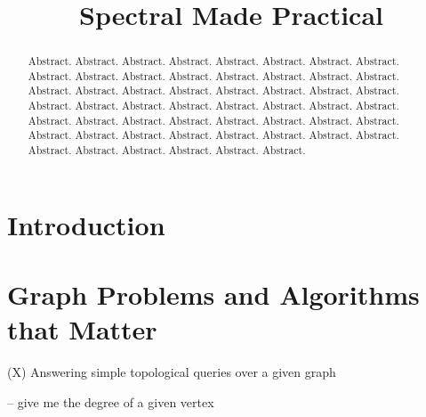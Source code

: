 \documentclass[preprint]{sig-alternate-05-2015}
\begin{document}
\title{Spectral Made Practical}

\maketitle

\begin{abstract}
%
Abstract. Abstract.  Abstract. Abstract.  Abstract. Abstract.  Abstract.
Abstract.  Abstract. Abstract.  Abstract. Abstract.  Abstract. Abstract.
Abstract. Abstract.  Abstract. Abstract.  Abstract. Abstract.  Abstract.
Abstract.  Abstract. Abstract.  Abstract. Abstract.  Abstract. Abstract.
Abstract. Abstract.  Abstract. Abstract.  Abstract. Abstract.  Abstract.
Abstract.  Abstract. Abstract.  Abstract. Abstract.  Abstract. Abstract.
Abstract. Abstract.  Abstract. Abstract.  Abstract. Abstract.  Abstract.
Abstract.  Abstract. Abstract.  Abstract. Abstract. 


%
\end{abstract}

% 
% 


\section{Introduction}

\section{Graph Problems and Algorithms that Matter}

(X) Answering simple topological queries over a given graph

-- give me the degree of a given vertex
\end{document}
